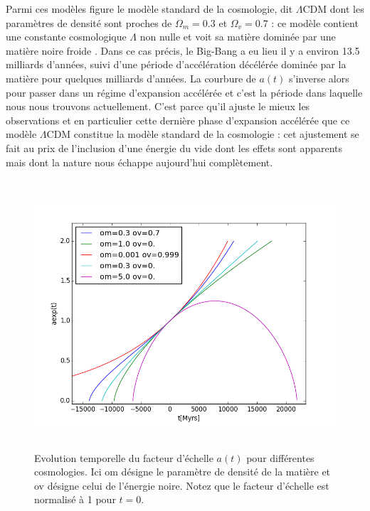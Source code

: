 Parmi ces modèles figure le modèle standard de la cosmologie, dit $\Lambda$CDM dont les paramètres de densité sont proches de $\Omega_m=0.3$ et $\Omega_v=0.7$ : ce modèle contient une constante cosmologique $\Lambda$ non nulle et voit sa matière dominée par une matière noire froide .  Dans ce cas précis, le Big-Bang a eu lieu il y a environ 13.5 milliards d'années, suivi d'une période d'accélération décélérée dominée par la matière pour quelques milliards d'années. La courbure de $a(t)$ s'inverse alors pour passer dans un régime d'expansion accélérée et c'est la période dans laquelle nous nous trouvons actuellement.  C'est parce qu'il ajuste le mieux les observations et en particulier cette dernière phase d'expansion accélérée que ce modèle $\Lambda$CDM constitue la modèle standard de la cosmologie : cet ajustement se fait au prix de l'inclusion d'une énergie du vide dont les effets sont apparents mais dont la nature nous échappe aujourd'hui complètement.

\begin{figure}[htbp]
	\centering
		\includegraphics[height=10cm]{figs/a2t_cosmo.png}
	\caption[Facteur d'échelle pour différentes cosmologie]{Evolution temporelle du facteur d'échelle $a(t)$ pour différentes cosmologies. Ici om désigne le paramètre de densité de la matière et ov désigne celui de l'énergie noire. Notez que le facteur d'échelle est normalisé à 1 pour $t=0$.}
	\label{f:aexpcosmo}
\end{figure}

